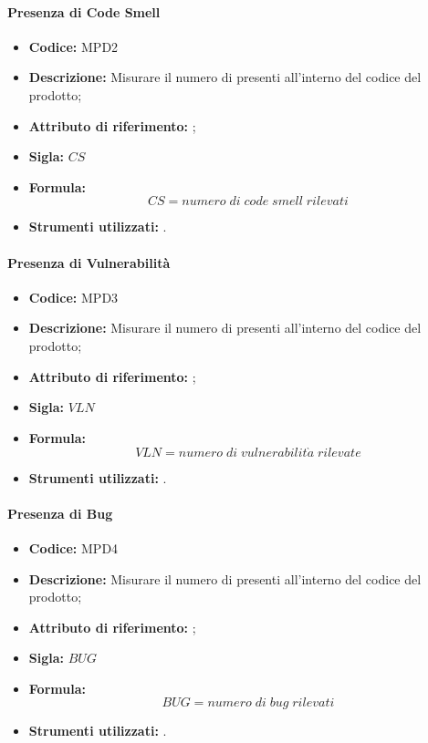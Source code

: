 \paragraph{Presenza di Code Smell} 
\begin{itemize}
    \item \textbf{Codice:} MPD2
    \item \textbf{Descrizione:} Misurare il numero di  presenti all'interno del codice del prodotto;
    \item \textbf{Attributo di riferimento:} ;
    \item \textbf{Sigla:} $CS$
    \item \textbf{Formula:} $$CS = {numero \; di \; code \; smell \; rilevati}$$
    \item \textbf{Strumenti utilizzati:} .
\end{itemize}

\paragraph{Presenza di Vulnerabilità} 
\begin{itemize}
    \item \textbf{Codice:} MPD3
    \item \textbf{Descrizione:} Misurare il numero di  presenti all'interno del codice del prodotto;
    \item \textbf{Attributo di riferimento:} ;
    \item \textbf{Sigla:} $VLN$
    \item \textbf{Formula:} $$VLN = {numero \; di \; vulnerabilit\grave{a} \; rilevate}$$
    \item \textbf{Strumenti utilizzati:} .
\end{itemize}

\paragraph{Presenza di Bug} 
\begin{itemize}
    \item \textbf{Codice:} MPD4
    \item \textbf{Descrizione:} Misurare il numero di  presenti all'interno del codice del prodotto;
    \item \textbf{Attributo di riferimento:} ;
    \item \textbf{Sigla:} $BUG$
    \item \textbf{Formula:} $$BUG = {numero \; di \; bug \; rilevati}$$
    \item \textbf{Strumenti utilizzati:} .
\end{itemize}


